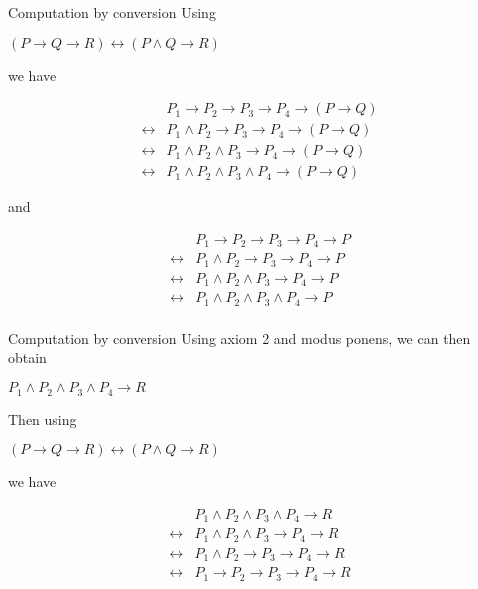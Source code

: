 \documentclass[presentation]{beamer}
\begin{document}
\begin{frame}[label={sec:orgheadline24}]{Computation by conversion}
\small
  Using

\begin{center}
\((P \rightarrow Q \rightarrow R) \leftrightarrow (P \wedge Q \rightarrow R)\)
\end{center}

we have

\begin{align*}
                  &P_1 \rightarrow P_2 \rightarrow P_3 \rightarrow P_4 \rightarrow (P \rightarrow Q)\\
  \leftrightarrow &P_1 \wedge P_2 \rightarrow P_3 \rightarrow P_4 \rightarrow (P \rightarrow Q)\\
  \leftrightarrow &P_1 \wedge P_2 \wedge P_3 \rightarrow P_4 \rightarrow (P \rightarrow Q)\\
  \leftrightarrow &P_1 \wedge P_2 \wedge P_3 \wedge P_4 \rightarrow (P \rightarrow Q)
\end{align*}

and

\begin{align*}
                  &P_1 \rightarrow P_2 \rightarrow P_3 \rightarrow P_4 \rightarrow P\\
  \leftrightarrow &P_1 \wedge P_2 \rightarrow P_3 \rightarrow P_4 \rightarrow P\\
  \leftrightarrow &P_1 \wedge P_2 \wedge P_3 \rightarrow P_4 \rightarrow P\\
  \leftrightarrow &P_1 \wedge P_2 \wedge P_3 \wedge P_4 \rightarrow P\\
\end{align*}
\end{frame}

\begin{frame}[label={sec:orgheadline25}]{Computation by conversion}
Using axiom 2 and modus ponens, we can then obtain

\begin{center}
\(P_1 \wedge P_2 \wedge P_3 \wedge P_4 \rightarrow R\)
\end{center}

Then using 

\begin{center}
\((P \rightarrow Q \rightarrow R) \leftrightarrow (P \wedge Q \rightarrow R)\)
\end{center}

we have

\begin{align*}
                  &P_1 \wedge P_2 \wedge P_3 \wedge P_4 \rightarrow R\\
  \leftrightarrow &P_1 \wedge P_2 \wedge P_3 \rightarrow P_4 \rightarrow R\\
  \leftrightarrow &P_1 \wedge P_2 \rightarrow P_3 \rightarrow P_4 \rightarrow R\\
  \leftrightarrow &P_1 \rightarrow P_2 \rightarrow P_3 \rightarrow P_4 \rightarrow R
\end{align*}
\end{frame}
\end{document}
